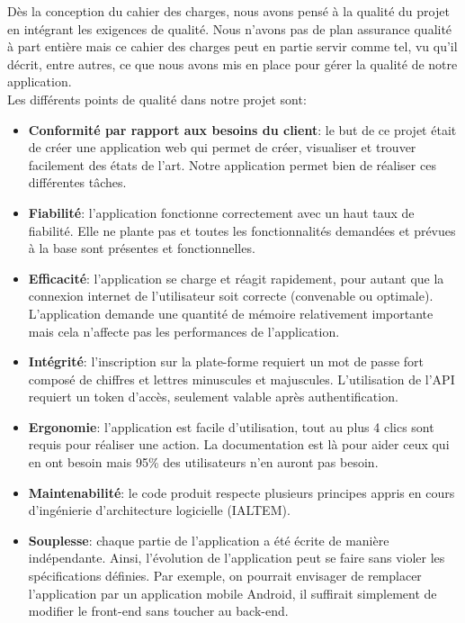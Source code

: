 \documentclass[t, 12pt, usenames,dvipsnames]{article}
\begin{document}
        \noindent Dès la conception du cahier des charges, nous avons pensé à la qualité du projet en intégrant les exigences de qualité. Nous n'avons pas de plan assurance qualité à part entière mais ce cahier des charges peut en partie servir comme tel, vu qu'il décrit, entre autres, ce que nous avons mis en place pour gérer la qualité de notre application.\\
        Les différents points de qualité dans notre projet sont:
        \begin{itemize}
            \item \textbf{Conformité par rapport aux besoins du client}: le but de ce projet était de créer une application web qui permet de créer, visualiser et trouver facilement des états de l'art. Notre application permet bien de réaliser ces différentes tâches.
            
            \item \textbf{Fiabilité}: l'application fonctionne correctement avec un haut taux de fiabilité. Elle ne plante pas et toutes les fonctionnalités demandées et prévues à la base sont présentes et fonctionnelles.
            
            \item \textbf{Efficacité}: l'application se charge et réagit rapidement, pour autant que la connexion internet de l'utilisateur soit correcte (convenable ou optimale). L'application demande une quantité de mémoire relativement importante mais cela n'affecte pas les performances de l'application.
            
            \item \textbf{Intégrité}: l'inscription sur la plate-forme requiert un mot de passe fort composé de chiffres et lettres minuscules et majuscules. L'utilisation de l'API requiert un token d'accès, seulement valable après authentification.
            
            \item \textbf{Ergonomie}: l'application est facile d'utilisation, tout au plus 4 clics sont requis pour réaliser une action. La documentation est là pour aider ceux qui en ont besoin mais 95\% des utilisateurs n'en auront pas besoin.
            
            \item \textbf{Maintenabilité}: le code produit respecte plusieurs principes appris en cours d'ingénierie d'architecture logicielle (IALTEM).
            \item \textbf{Souplesse}: chaque partie de l'application a été écrite de manière indépendante. Ainsi, l'évolution de l'application peut se faire sans violer les spécifications définies. Par exemple, on pourrait envisager de remplacer l'application par un application mobile Android, il suffirait simplement de modifier le front-end sans toucher au back-end.


\end{itemize}
\end{document}
